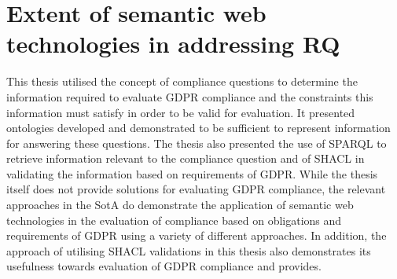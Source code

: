 \section{Extent of semantic web technologies in addressing RQ}

This thesis utilised the concept of compliance questions to determine the information required to evaluate GDPR compliance and the constraints this information must satisfy in order to be valid for evaluation.
It presented ontologies developed and demonstrated to be sufficient to represent information for answering these questions.
The thesis also presented the use of SPARQL to retrieve information relevant to the compliance question and of SHACL in validating the information based on requirements of GDPR.
While the thesis itself does not provide solutions for evaluating GDPR compliance, the relevant approaches in the SotA do demonstrate the application of semantic web technologies in the evaluation of compliance based on obligations and requirements of GDPR using a variety of different approaches.
In addition, the approach of utilising SHACL validations in this thesis also demonstrates its usefulness towards evaluation of GDPR compliance and provides.


